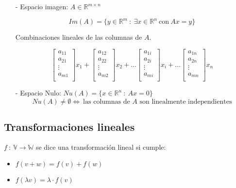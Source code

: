 \begin{itemize}
    \item[-] Espacio imagen: $A \in \mathbb{R}^{m \times n}$ 
    
    \[Im(A) = \{y \in \mathbb{R}^{m} ~:~ \exists x\in \mathbb{R}^{n} ~\text{con}~ Ax = y\}\]
    
    Combinaciones lineales de las columnas de $A$.
    
    \[
    \begin{bmatrix}
    a_{11} \\
    a_{21} \\
    \vdots \\
    a_{m1} \\
    \end{bmatrix}
    x_1 +
    \begin{bmatrix}
    a_{12} \\
    a_{22} \\
    \vdots \\
    a_{m2} \\
    \end{bmatrix}
    x_2 + \ldots
    \begin{bmatrix}
    a_{1i} \\
    a_{2i} \\
    \vdots \\
    a_{mi} \\
    \end{bmatrix}
    x_i + \ldots
    \begin{bmatrix}
    a_{1n} \\
    a_{2n} \\
    \vdots \\
    a_{mn} \\
    \end{bmatrix}
    x_n
    \]
    
    \item[-] Espacio Nulo: $Nu(A) = \{x \in \mathbb{R}^{n} ~:~ Ax = 0\}$
    \[Nu(A) \neq \emptyset \iff ~\text{las columnas de $A$ son linealmente independientes}\]    
\end{itemize}

\subsection{Transformaciones lineales}\label{subsec:transformaciones_lineales}

$f ~:~ \mathbb{V} \to \mathbb{W}$  se dice una transformación lineal si cumple:

\begin{itemize}
    \item $f(v + w) = f(v) + f(w)$
    \item $f(\lambda v) = \lambda \cdot f(v)$
\end{itemize}

